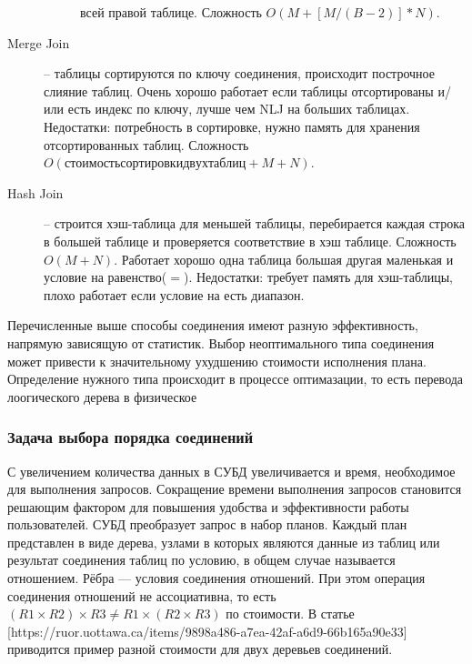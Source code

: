 \documentclass[12pt]{article}
\begin{document}
\begin{flushleft}
\begin{description}
\begin{description}
        всей правой таблице. Сложность $O(M + [M/(B-2)] * N)$.
    \end{description}
    \item[Merge Join] --  таблицы сортируются по ключу соединения, происходит 
    построчное  слияние таблиц. Очень хорошо работает если таблицы отсортированы 
    и/или есть индекс по ключу, лучше чем NLJ на больших таблицах. 
    Недостатки: потребность в сортировке, нужно память для хранения 
    отсортированных таблиц. Сложность $O(стоимость сортировки двух таблиц + M + N)$.
    \item[Hash Join] -- строится хэш-таблица для меньшей таблицы, перебирается 
    каждая строка в большей таблице и проверяется соответствие в хэш таблице. 
    Сложность $O(M+N)$. Работает хорошо одна таблица большая другая маленькая и 
    условие на равенство($=$). Недостатки: требует память для хэш-таблицы, плохо 
    работает если условие на есть диапазон.
\end{description}
Перечисленные выше способы соединения имеют разную эффективность, напрямую зависящую
от статистик. Выбор неоптимального типа соединения может привести к значительному 
ухудшению стоимости исполнения плана. Определение нужного типа происходит в процессе
оптимазации, то есть перевода лоогического дерева в физическое 

\centering \subsubsection*{Задача выбора порядка соединений}
\raggedright

С увеличением количества данных в СУБД увеличивается и время, необходимое для 
выполнения запросов. Сокращение времени выполнения запросов становится решающим 
фактором для повышения удобства и эффективности работы пользователей. СУБД 
преобразует запрос в набор планов. Каждый план представлен в виде дерева, узлами 
в которых являются данные из таблиц или результат соединения таблиц по условию, 
в общем случае называется отношением. Рёбра — условия соединения отношений.
При этом операция соединения отношений не ассоциативна, то есть
$(R1 \times R2) \times R3 \neq R1 \times (R2 \times R3)$ по стоимости.
В статье  [https://ruor.uottawa.ca/items/9898a486-a7ea-42af-a6d9-66b165a90e33] приводится
пример разной стоимости для двух деревьев соединений.
\begin{center}
\end{center}
\end{flushleft}
\end{document}
